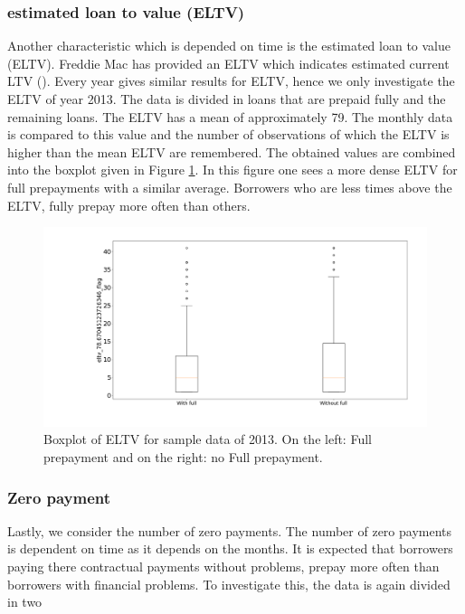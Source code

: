     \subsubsection{estimated loan to value (ELTV)}
    Another characteristic which is depended on time is the
    estimated loan to value (ELTV). Freddie Mac has provided an
    ELTV which
    indicates estimated current LTV
    (\cite{FredieMac}). Every year gives similar results for ELTV,
    hence we only investigate the ELTV of year 2013. The data
    is divided in loans that are prepaid fully and the
    remaining loans. The ELTV has a mean of
    approximately 79. The monthly data is compared to
    this value and the number of observations of which
    the ELTV is higher than the mean ELTV are
    remembered. The obtained values are combined into
    the boxplot given in Figure
    \ref{Model_boxplot_eltv_2013}. In this figure one sees a more
    dense ELTV for full prepayments with a similar average. 
    Borrowers who are less times above the ELTV, fully prepay more often than others. 
    
    \begin{figure}[H]
        \centering
        \includegraphics[width=\linewidth]{Figures/eltv_2013.png}
        \caption{Boxplot of ELTV for sample data of 2013.  On the left: Full prepayment and on the right: no Full prepayment.}
        \label{Model_boxplot_eltv_2013}
    \end{figure}
    
    \subsubsection{Zero payment}
    Lastly, we consider the number of zero payments. The number of
    zero payments is dependent on time as it depends on the months.
    It is expected that borrowers paying there contractual payments
    without problems, prepay more often than borrowers with
    financial problems. To investigate this, the data is again
    divided in two 
    